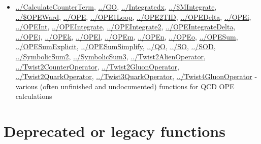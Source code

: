 \documentclass[../FeynCalcManual.tex]{subfiles}
\begin{document}
\begin{itemize}
\tightlist
\item
  \hyperlink{../calculatecounterterm}{../CalculateCounterTerm},
  \hyperlink{../go}{../GO}, \hyperlink{../integratedx}{../Integratedx},
  \hyperlink{../dollarmintegrate}{../\$MIntegrate},
  \hyperlink{../dollaropeward}{../\$OPEWard},
  \hyperlink{../ope}{../OPE}, \hyperlink{../ope1loop}{../OPE1Loop},
  \hyperlink{../ope2tid}{../OPE2TID},
  \hyperlink{../opedelta}{../OPEDelta}, \hyperlink{../opei}{../OPEi},
  \hyperlink{../opeint}{../OPEInt},
  \hyperlink{../opeintegrate}{../OPEIntegrate},
  \hyperlink{../opeintegrate2}{../OPEIntegrate2},
  \hyperlink{../opeintegratedelta}{../OPEIntegrateDelta},
  \hyperlink{../opej}{../OPEj}, \hyperlink{../opek}{../OPEk},
  \hyperlink{../opel}{../OPEl}, \hyperlink{../opem}{../OPEm},
  \hyperlink{../open}{../OPEn}, \hyperlink{../opeo}{../OPEo},
  \hyperlink{../opesum}{../OPESum},
  \hyperlink{../opesumexplicit}{../OPESumExplicit},
  \hyperlink{../opesumsimplify}{../OPESumSimplify},
  \hyperlink{../qo}{../QO}, \hyperlink{../so}{../SO},
  \hyperlink{../sod}{../SOD},
  \hyperlink{../symbolicsum2}{../SymbolicSum2},
  \hyperlink{../symbolicsum3}{../SymbolicSum3},
  \hyperlink{../twist2alienoperator}{../Twist2AlienOperator},
  \hyperlink{../twist2counteroperator}{../Twist2CounterOperator},
  \hyperlink{../twist2gluonoperator}{../Twist2GluonOperator},
  \hyperlink{../twist2quarkoperator}{../Twist2QuarkOperator},
  \hyperlink{../twist3quarkoperator}{../Twist3QuarkOperator},
  \hyperlink{../twist4gluonoperator}{../Twist4GluonOperator} - various
  (often unfinished and undocumented) functions for QCD OPE calculations
\end{itemize}

\hypertarget{deprecated or legacy functions}{
\section{Deprecated or legacy functions}\label{deprecated or legacy functions}}
\end{document}
